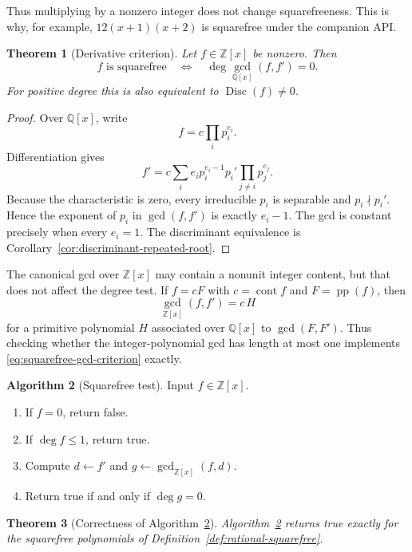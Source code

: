 \documentclass[11pt]{book}
\newtheorem{theorem}{Theorem}[section]
\theoremstyle{definition}
\newtheorem{algorithm}[theorem]{Algorithm}
\newcommand{\ZZ}{\mathbb Z}
\begin{document}
Thus multiplying by a nonzero integer does not change squarefreeness.  This is
why, for example, $12(x+1)(x+2)$ is squarefree under the companion API.

\begin{theorem}[Derivative criterion]\label{thm:squarefree-derivative-criterion}
Let $f\in\ZZ[x]$ be nonzero.  Then
\begin{equation}\label{eq:squarefree-gcd-criterion}
 f\text{ is squarefree}
 \quad\Longleftrightarrow\quad
 \deg\gcd_{\mathbb Q[x]}(f,f')=0.
\end{equation}
For positive degree this is also equivalent to
$\operatorname{Disc}(f)\ne0$.
\end{theorem}

\begin{proof}
Over $\mathbb Q[x]$, write
\[
 f=c\prod_i p_i^{e_i}.
\]
Differentiation gives
\[
 f'=c\sum_i e_i p_i^{e_i-1}p_i'
       \prod_{j\ne i}p_j^{e_j}.
\]
Because the characteristic is zero, every irreducible $p_i$ is separable and
$p_i\nmid p_i'$.  Hence the exponent of $p_i$ in $\gcd(f,f')$ is exactly
$e_i-1$.  The gcd is constant precisely when every $e_i=1$.  The
discriminant equivalence is Corollary~\ref{cor:discriminant-repeated-root}.
\end{proof}

The canonical gcd over $\ZZ[x]$ may contain a nonunit integer content, but
that does not affect the degree test.  If $f=cF$ with $c=\operatorname{cont}f$
and $F=\operatorname{pp}(f)$, then
\[
 \gcd_{\ZZ[x]}(f,f')
 =c\,H
\]
for a primitive polynomial $H$ associated over $\mathbb Q[x]$ to
$\gcd(F,F')$.  Thus checking whether the integer-polynomial gcd has length at
most one implements \eqref{eq:squarefree-gcd-criterion} exactly.

\begin{algorithm}[Squarefree test]\label{alg:is-squarefree}
Input $f\in\ZZ[x]$.
\begin{enumerate}
 \item If $f=0$, return false.
 \item If $\deg f\le1$, return true.
 \item Compute $d\leftarrow f'$ and $g\leftarrow\gcd_{\ZZ[x]}(f,d)$.
 \item Return true if and only if $\deg g=0$.
\end{enumerate}
\end{algorithm}

\begin{theorem}[Correctness of Algorithm~\ref{alg:is-squarefree}]
Algorithm~\ref{alg:is-squarefree} returns true exactly for the squarefree
polynomials of Definition~\ref{def:rational-squarefree}.
\end{theorem}
\end{document}
